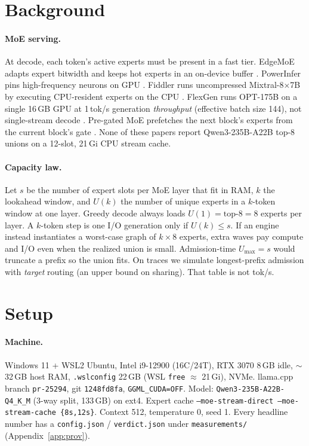 \documentclass[11pt]{article}
\newcommand{\tps}{tok/s}
\begin{document}
\section{Background}
\label{sec:bg}

\paragraph{MoE serving.}
At decode, each token's active experts must be present in a fast tier.
EdgeMoE adapts expert bitwidth and keeps hot experts in an on-device buffer
\citep{yi2023edgemoe}. PowerInfer pins high-frequency neurons on GPU
\citep{song2024powerinfer}. Fiddler runs uncompressed Mixtral-8$\times$7B by
executing CPU-resident experts on the CPU \citep{kamahori2025fiddler}. FlexGen
runs OPT-175B on a single 16\,GB GPU at 1\,\tps{} generation \emph{throughput}
(effective batch size 144), not single-stream decode
\citep{sheng2023flexgen}. Pre-gated MoE prefetches the next block's experts
from the current block's gate \citep{hwang2023pregated}. None of these papers
report Qwen3-235B-A22B top-8 unions on a 12-slot, 21\,Gi CPU stream cache.

\paragraph{Capacity law.}
Let $s$ be the number of expert slots per MoE layer that fit in RAM, $k$ the
lookahead window, and $U(k)$ the number of unique experts in a $k$-token window
at one layer. Greedy decode always loads $U(1)=\mathrm{top}\text{-}8=8$ experts per
layer. A $k$-token step is one I/O generation only if $U(k)\le s$. If an engine
instead instantiates a worst-case graph of $k\times 8$ experts, extra waves pay
compute and I/O even when the realized union is small.
Admission-time $U_{\max}{=}s$ would truncate a prefix so the union fits. On
traces we simulate longest-prefix admission with \emph{target} routing (an upper
bound on sharing). That table is not tok/s.

\section{Setup}
\label{sec:setup}

\paragraph{Machine.}
Windows 11 + WSL2 Ubuntu, Intel i9-12900 (16C/24T), RTX 3070 8\,GB idle,
$\sim$32\,GB host RAM, \texttt{.wslconfig} 22\,GB (WSL \texttt{free}
$\approx$ 21\,Gi), NVMe. llama.cpp branch \texttt{pr-25294}, git
\texttt{1248fd8fa}, \texttt{GGML\_CUDA=OFF}. Model:
\texttt{Qwen3-235B-A22B-Q4\_K\_M} (3-way split, 133\,GB) on ext4. Expert cache
\texttt{--moe-stream-direct --moe-stream-cache \{8s,12s\}}. Context 512,
temperature 0, seed 1. Every headline number has a \texttt{config.json} /
\texttt{verdict.json} under \texttt{measurements/} (Appendix~\ref{app:prov}).
\end{document}
